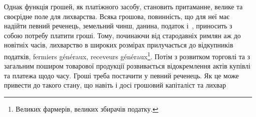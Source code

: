 Однак функція грошей, як платіжного засобу, становить притаманне, велике
та своєрідне поле для лихварства. Всяка грошова, повинність, що для неї має
надійти певний реченець, земельний чинш, данина, податок і~, приносить
з собою потребу платити гроші. Тому, починаючи від стародавніх римлян аж
до новітніх часів, лихварство в широких розмірах прилучається до відкупників
податків, fermiers généraux, receveurs généraux\footnote*{
Великих фармерів, великих збирачів податку. 
}. Потім з розвитком торговлі та
з загальним поширом товарової продукції розвивається відокремлення актів купівлі
та платежа щодо часу. Гроші треба постачити у певний реченець. Як це може
привести до такого стану, що навіть і досі грошовий капіталіст та лихвар
\parbreak{}  %
